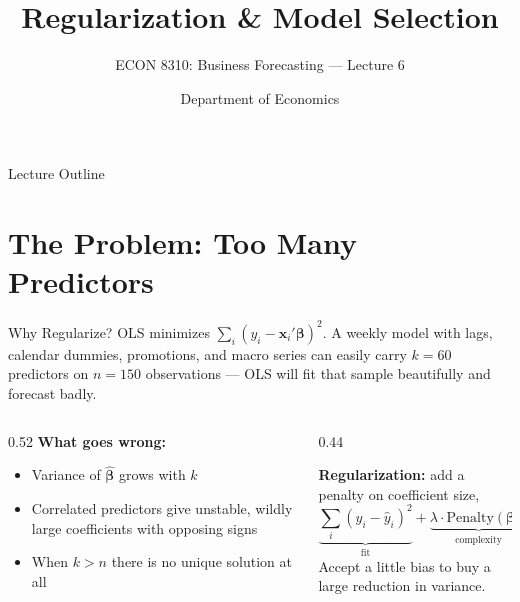 \documentclass[aspectratio=169, 11pt]{beamer}
\title[Regularization \& Model Selection]{Regularization \& Model Selection}
\subtitle{ECON 8310: Business Forecasting --- Lecture 6}
\author{Department of Economics}
\institute{University of Nebraska at Omaha}
\begin{document}

\begin{frame}
  \titlepage
\end{frame}

\begin{frame}{Lecture Outline}
  \tableofcontents
\end{frame}

\section{The Problem: Too Many Predictors}


\begin{frame}{Why Regularize?}
  OLS minimizes $\sum_{i}(y_i - \mathbf{x}_i'\boldsymbol{\beta})^2$.
  A weekly model with lags, calendar dummies, promotions, and macro series can
  easily carry $k = 60$ predictors on $n = 150$ observations --- OLS will fit
  that sample beautifully and forecast badly.
  \begin{columns}[T]
    \begin{column}{0.52\textwidth}
      \textbf{What goes wrong:}
      \begin{itemize}\small\itemsep0pt
        \item Variance of $\hat{\boldsymbol{\beta}}$ grows with $k$
        \item Correlated predictors give unstable, wildly large
              coefficients with opposing signs
        \item When $k > n$ there is no unique solution at all
      \end{itemize}
    \end{column}
    \begin{column}{0.44\textwidth}
      \begin{keybox}
        \small \textbf{Regularization:} add a penalty on coefficient size,
        \[
          \underbrace{\textstyle\sum_i (y_i - \hat{y}_i)^2}_{\text{fit}}
          + \underbrace{\lambda \cdot \text{Penalty}(\boldsymbol{\beta})}_{\text{complexity}}
        \]
        Accept a little bias to buy a large reduction in variance.
      \end{keybox}
    \end{column}
  \end{columns}
\end{frame}
\end{document}

